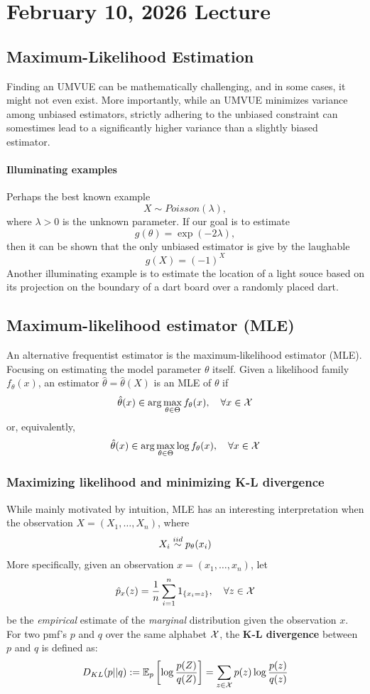 \documentclass[11pt]{book}
\begin{document}

\newcommand{\Cov}{\mathrm{Cov}}

\theoremstyle{definition}
\newtheorem{exmp}{Example}[section]

\chapter{February 10, 2026 Lecture}
\section{Maximum-Likelihood Estimation}
Finding an UMVUE can be mathematically challenging, and in some cases, it might not even exist. More importantly, while an UMVUE minimizes variance 
among unbiased estimators, strictly adhering to the unbiased constraint can somestimes lead to a significantly higher variance than a slightly biased estimator.
\subsubsection{Illuminating examples}
Perhaps the best known example 
\[
  X \sim Poisson(\lambda),
\]
where $\lambda > 0$ is the unknown parameter. If our goal is to estimate 
\[
  g(\theta) = \exp(-2\lambda),
\] 
then it can be shown that the only unbiased estimator is give by the laughable 
\[
  \hat{g}(X) = (-1)^X 
\]
Another illuminating example is to estimate the location of a light souce based on its projection on the boundary of 
a dart board over a randomly placed dart.
\section{Maximum-likelihood estimator (MLE)}
An alternative frequentist estimator is the maximum-likelihood estimator (MLE). Focusing on estimating the model parameter $\theta$ itself. Given a likelihood 
family $f_\theta(x)$, an estimator $\hat{\theta} = \hat{\theta}(X)$ is an MLE of $\theta$ if 
\[
  \hat{\theta}(x) \in \arg\max_{\theta\in\Theta} f_\theta(x), \quad \forall x\in\mathcal{X}
\]
or, equivalently,
\[
  \hat{\theta}(x) \in \arg\max_{\theta\in\Theta} \log f_\theta(x), \quad \forall x\in\mathcal{X}
\]
\subsection{Maximizing likelihood and minimizing K-L divergence}
While mainly motivated by intuition, MLE has an interesting interpretation when the observation $X = (X_1, \dots, X_n)$, where 
\[
  X_i \overset{iid}{\sim} p_\theta(x_i)
\]
More specifically, given an observation $x = (x_1, \dots, x_n)$, let 
\[
  \hat{p}_x (z) = \frac{1}{n}\sum_{i=1}^n 1_{\{x_i=z\}}, \quad \forall z \in\mathcal{X} 
\]
be the \textit{empirical} estimate of the \textit{marginal} distribution given the observation $x$. For two pmf's $p$ and $q$ 
over the same alphabet $\mathcal{X}$, the \textbf{K-L divergence} between $p$ and $q$ is defined as: 
\[
  D_{KL}(p || q) := \mathbb{E}_p \left[ \log\frac{p(Z)}{q(Z)} \right] = \sum_{z\in\mathcal{X}} p(z) \log \frac{p(z)}{q(z)}
\]
\end{document}
